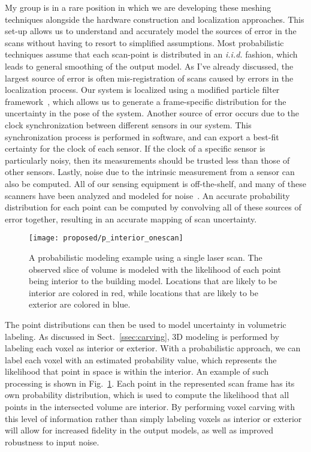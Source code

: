 \documentclass[journal]{IEEEtran}
\begin{document}
My group is in a rare position in which we are developing these meshing techniques alongside the hardware construction and localization approaches.  This set-up allows us to understand and accurately model the sources of error in the scans without having to resort to simplified assumptions.  Most probabilistic techniques assume that each scan-point is distributed in an {\it i.i.d.} fashion, which leads to general smoothing of the output model.  As I've already discussed, the largest source of error is often mis-registration of scans caused by errors in the localization process.  Our system is localized using a modified particle filter framework~\cite{NickJournal}, which allows us to generate a frame-specific distribution for the uncertainty in the pose of the system.  Another source of error occurs due to the clock synchronization between different sensors in our system.  This synchronization process is performed in software, and can export a best-fit certainty for the clock of each sensor.  If the clock of a specific sensor is particularly noisy, then its measurements should be trusted less than those of other sensors.  Lastly, noise due to the intrinsic measurement from a sensor can also be computed.  All of our sensing equipment is off-the-shelf, and many of these scanners have been analyzed and modeled for noise~\cite{HokuyoNoise}.  An accurate probability distribution for each point can be computed by convolving all of these sources of error together, resulting in an accurate mapping of scan uncertainty.

\begin{figure}[t]
	\centerline{\texttt{[image: proposed/p\_interior\_onescan]}}
	\caption{A probabilistic modeling example using a single laser scan.  The observed slice of volume is modeled with the likelihood of each point being interior to the building model.  Locations that are likely to be interior are colored in red, while locations that are likely to be exterior are colored in blue.}
	\label{fig:prob_onescan}
\end{figure}

The point distributions can then be used to model uncertainty in volumetric labeling.  As discussed in Sect.~\ref{ssec:carving}, 3D modeling is performed by labeling each voxel as interior or exterior.  With a probabilistic approach, we can label each voxel with an estimated probability value, which represents the likelihood that point in space is within the interior.  An example of such processing is shown in Fig.~\ref{fig:prob_onescan}.  Each point in the represented scan frame has its own probability distribution, which is used to compute the likelihood that all points in the intersected volume are interior.  By performing voxel carving with this level of information rather than simply labeling voxels as interior or exterior will allow for increased fidelity in the output models, as well as improved robustness to input noise.
\end{document}
